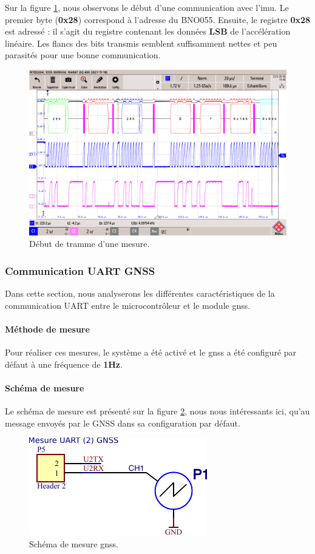 Sur la figure \ref{fig:tramme-mesure}, nous observons le début d'une communication avec l'\gls{imu}. Le premier byte (\textbf{0x28}) correspond à l'adresse du BNO055. Ensuite, le registre \textbf{0x28} est adressé : il s'agit du registre contenant les données \textbf{LSB} de l'accélération linéaire. Les flancs des bits transmis semblent suffisamment nettes et peu parasités pour une bonne communication.

\begin{figure}[H]
	\centering
	\includegraphics[width=.7\linewidth]{../figures/mesures/I2C/Tramme-mesure}
	\caption{Début de tramme d'une mesure.}
	\label{fig:tramme-mesure}
\end{figure}

\clearpage

\subsubsection{Communication UART GNSS} \label{ssec:Comm-UART}
Dans cette section, nous analyserons les différentes caractéristiques de la communication UART entre le microcontrôleur et le module \gls{gnss}.

\paragraph{Méthode de mesure} Pour réaliser ces mesures, le système a été activé et le \gls{gnss} a été configuré par défaut à une fréquence de \textbf{1Hz}.

\paragraph{Schéma de mesure} Le schéma de mesure est présenté sur la figure \ref{fig:scheam-mesure-uart-gnss}, nous nous intéressants ici, qu'au message envoyés par le GNSS dans sa configuration par défaut. 
\begin{figure}[h]
	\centering
	\includegraphics[width=0.4\linewidth]{../figures/mesures/UART/scheam-mesure-uart-gnss}
	\caption{Schéma de mesure \gls{gnss}.}
	\label{fig:scheam-mesure-uart-gnss}
\end{figure}



